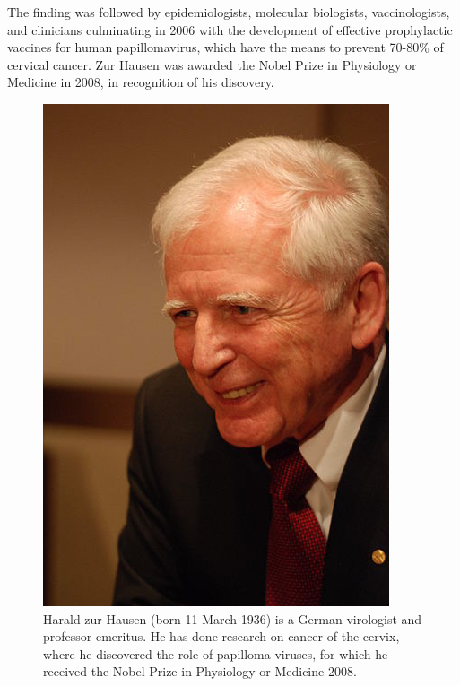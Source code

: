 The finding was followed by epidemiologists, molecular biologists, vaccinologists, and clinicians culminating in 2006 with the development of effective prophylactic vaccines for human papillomavirus, which have the means to prevent 70-80\% of cervical cancer. Zur Hausen was awarded the Nobel Prize in Physiology or Medicine in 2008, in recognition of his discovery.

\begin{figure}[ht]
	\centering
	\includegraphics[scale=0.7]{IMG/zurHausen.png}
	\caption{Harald zur Hausen (born 11 March 1936) is a German virologist and professor emeritus. He has done research on cancer of the cervix, where he discovered the role of papilloma viruses, for which he received the Nobel Prize in Physiology or Medicine 2008.}
	\label{zurHausen}
\end{figure} 

